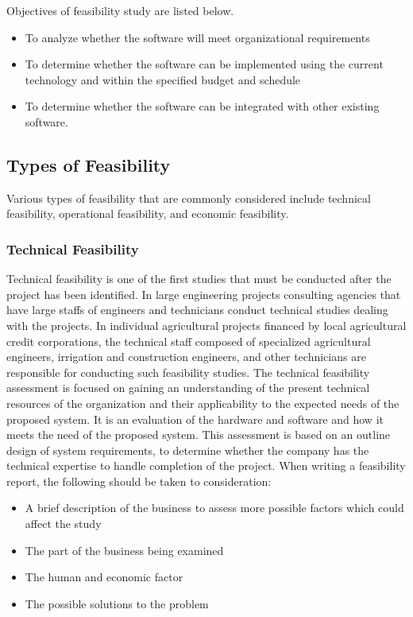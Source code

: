 Objectives of feasibility study are listed below.
\begin{itemize}
	\item To analyze whether the software will meet organizational requirements
	\item To determine whether the software can be implemented using the current technology and within the specified budget and schedule
	\item To determine whether the software can be integrated with other existing software.
\end{itemize}

\subsection{Types of Feasibility}
Various types of feasibility that are commonly considered include technical feasibility, operational feasibility, and economic feasibility.

\subsubsection{Technical Feasibility}
Technical feasibility is one of the first studies that must be conducted after the project has been identified. In large engineering projects consulting agencies that have large staffs of engineers and technicians conduct technical studies dealing with the projects. In individual agricultural projects financed by local agricultural credit corporations, the technical staff composed of specialized agricultural engineers, irrigation and construction engineers, and other technicians are responsible for conducting such feasibility studies. The technical feasibility assessment is focused on gaining an understanding of the present technical resources of the organization and their applicability to the expected needs of the proposed system. It is an evaluation of the hardware and software and how it meets the need of the proposed system. This assessment is based on an outline design of system requirements, to determine whether the company has the technical expertise to handle completion of the project. When writing a feasibility report, the following should be taken to consideration:
\begin{itemize}
	\item A brief description of the business to assess more possible factors which could affect the study
	\item The part of the business being examined
	\item The human and economic factor
	\item The possible solutions to the problem
\end{itemize}

